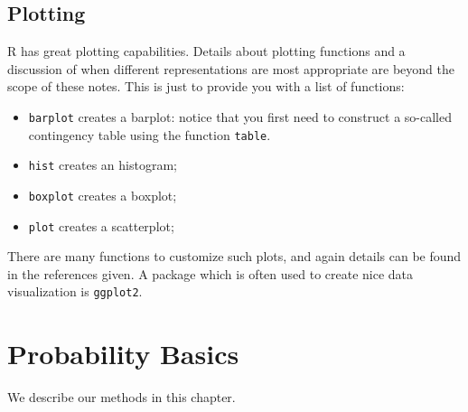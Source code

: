 \documentclass[
]{book}
\begin{document}
\hypertarget{plotting}{%
\section{Plotting}\label{plotting}}

R has great plotting capabilities. Details about plotting functions and a discussion of when different representations are most appropriate are beyond the scope of these notes. This is just to provide you with a list of functions:

\begin{itemize}
\item
  \texttt{barplot} creates a barplot: notice that you first need to construct a so-called contingency table using the function \texttt{table}.
\item
  \texttt{hist} creates an histogram;
\item
  \texttt{boxplot} creates a boxplot;
\item
  \texttt{plot} creates a scatterplot;
\end{itemize}

There are many functions to customize such plots, and again details can be found in the references given. A package which is often used to create nice data visualization is \texttt{ggplot2}.

\hypertarget{probability-basics}{%
\chapter{Probability Basics}\label{probability-basics}}

We describe our methods in this chapter.

  
\end{document}
